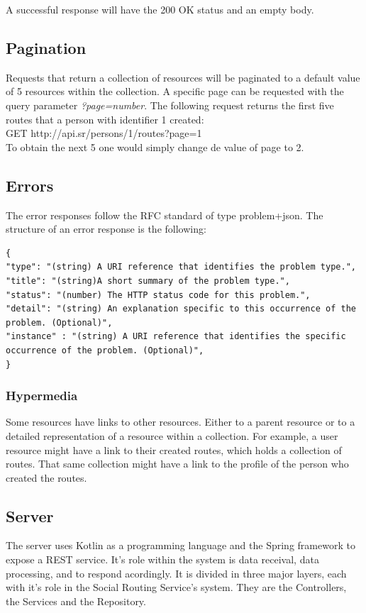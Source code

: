         A successful response will have the 200 OK status and an empty body.
    
    \subsection*{Pagination}
    Requests that return a collection of resources will be paginated to a default value of 5 resources within the collection. 
    A specific page can be requested with the query parameter \textit{?page={number}}. 
    The following request returns the first five routes that a person with identifier 1 created:\\
    GET http://api.sr/persons/1/routes?page=1\\
    To obtain the next 5 one would simply change de value of page to 2.

    \subsection*{Errors}
    The error responses follow the RFC standard of type problem+json. The structure of an error response is the following:
    \begin{lstlisting}
{
"type": "(string) A URI reference that identifies the problem type.",
"title": "(string)A short summary of the problem type.",
"status": "(number) The HTTP status code for this problem.",
"detail": "(string) An explanation specific to this occurrence of the problem. (Optional)",
"instance" : "(string) A URI reference that identifies the specific occurrence of the problem. (Optional)",
}
    \end{lstlisting}

    \subsubsection*{Hypermedia}
    Some resources have links to other resources. Either to a parent resource or to a detailed representation of a 
    resource within a collection. For example, a user resource might have a link to their created routes, which 
    holds a collection of routes. That same collection might have a link to the profile of the person who created 
    the routes.

\subsection*{Server} 
The server uses Kotlin as a programming language and the Spring framework to expose a REST service.
It's role within the system is data receival, data processing, and to respond acordingly.
It is divided in three major layers, each with it's role in the Social Routing Service's system. 
They are the Controllers, the Services and the Repository.\\

